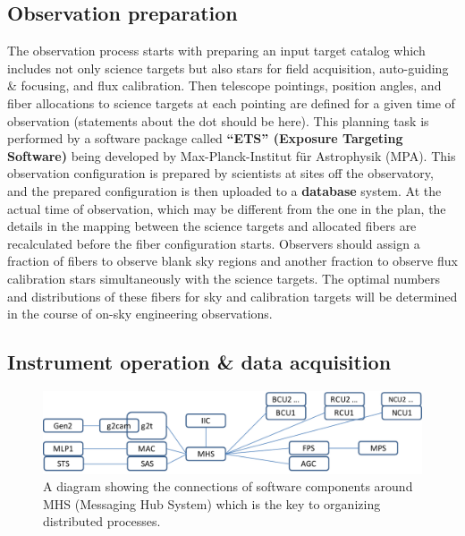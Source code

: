 \documentclass[a4paper]{article}
\begin{document}
\subsection{Observation preparation}

The observation process starts with preparing an input target catalog
which includes not only science targets but also stars for field
acquisition, auto-guiding \& focusing, and flux calibration.  Then
telescope pointings, position angles, and fiber allocations to science
targets at each pointing are defined for a given time of observation
(statements about the dot should be here). This planning task is
performed by a software package called {\bf ``ETS'' (Exposure
  Targeting Software)} being developed by Max-Planck-Institut f\"{u}r
Astrophysik (MPA). This observation configuration is prepared by
scientists at sites off the observatory, and the prepared
configuration is then uploaded to a {\bf database} system. At the
actual time of observation, which may be different from the one in the
plan, the details in the mapping between the science targets and
allocated fibers are recalculated before the fiber configuration
starts. Observers should assign a fraction of fibers to observe blank
sky regions and another fraction to observe flux calibration stars
simultaneously with the science targets. The optimal numbers and
distributions of these fibers for sky and calibration targets will be
determined in the course of on-sky engineering observations.

\subsection{Instrument operation \& data acquisition}

\begin{figure}[!htb]
\begin{center}
\includegraphics[scale=0.5]{./figures/software_connections.pdf}
\end{center}
\caption{A diagram showing the connections of software components
  around MHS (Messaging Hub System) which is the key to organizing
  distributed processes. \label{fig:pfs_software_connections}}
\end{figure}
\end{document}
